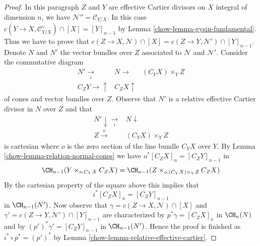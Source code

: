\begin{proof}
\medskip\noindent
In this paragraph $Z$ and $Y$ are effective Cartier divisors on $X$
integral of dimension $n$, we have $\mathcal{N}'' = \mathcal{C}_{Y/X}$.
In this case $c(Y \to X, \mathcal{C}_{Y/X}^\vee) \cap [X] = [Y]_{n - 1}$ by
Lemma \ref{chow-lemma-gysin-fundamental}. Thus we have to prove that
$c(Z \to X, \mathcal{N}) \cap [X] = c(Z \to Y, \mathcal{N}') \cap [Y]_{n - 1}$.
Denote $N$ and $N'$ the vector bundles over $Z$ associated to
$\mathcal{N}$ and $\mathcal{N}'$. Consider the commutative diagram
$$
\begin{array}{ccc}N' \underset{i}{\longrightarrow} & N \longrightarrow & (C_Y X) \times_Y Z \\ C_Z Y \longrightarrow\uparrow & C_Z X \uparrow & \end{array}
$$
of cones and vector bundles over $Z$. Observe that $N'$ is a relative
effective Cartier divisor in $N$ over $Z$ and that
$$
\begin{array}{cc}N' \downarrow\underset{i}{\longrightarrow} & N \downarrow \\ Z \overset{o}{\longrightarrow} & (C_Y X) \times_Y Z\end{array}
$$
is cartesian where $o$ is the zero section of the line bundle
$C_Y X$ over $Y$. By
Lemma \ref{chow-lemma-relation-normal-cones} we have $o^*[C_ZX]_n = [C_Z Y]_{n - 1}$
in
$$
\CH_{n - 1}(Y \times_{o, C_Y X} C_ZX) =
\CH_{n - 1}(Z \times_{o, (C_Y X) \times_Y Z} C_ZX)
$$
By the cartesian property of
the square above this implies that
$$
i^*[C_ZX]_n = [C_Z Y]_{n - 1}
$$
in $\CH_{n - 1}(N')$. Now observe that
$\gamma = c(Z \to X, \mathcal{N}) \cap [X]$ and
$\gamma' = c(Z \to Y, \mathcal{N}') \cap [Y]_{n - 1}$
are characterized by $p^*\gamma = [C_Z X]_n$ in $\CH_n(N)$
and by $(p')^*\gamma' = [C_Z Y]_{n - 1}$ in $\CH_{n - 1}(N')$.
Hence the proof is finished as $i^* \circ p^* = (p')^*$ by
Lemma \ref{chow-lemma-relative-effective-cartier}.
\end{proof}

